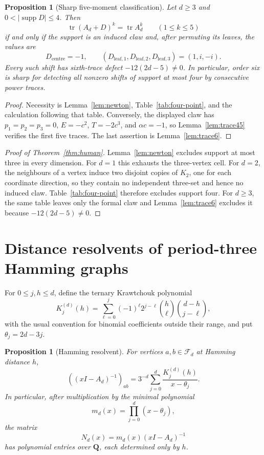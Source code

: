 \documentclass[11pt,reqno]{amsart}
\newtheorem{proposition}[theorem]{Proposition}
\theoremstyle{definition}
\theoremstyle{remark}
\DeclareMathOperator{\supp}{supp}
\DeclareMathOperator{\tr}{tr}
\newcommand{\Q}{\mathbf Q}
\begin{document}
\begin{proposition}[Sharp five-moment classification]\label{prop:five-moment}
Let $d\geq3$ and $0<|\supp D|\leq4$.  Then
\[
 \tr(A_d+D)^k=\tr A_d^k\qquad(1\leq k\leq5)
\]
if and only if the support is an induced claw and, after permuting its
leaves, the values are
\[
 D_{\mathrm{centre}}=-1,
 \qquad
 (D_{\mathrm{leaf},1},D_{\mathrm{leaf},2},D_{\mathrm{leaf},3})=(1,i,-i).
\]
Every such shift has sixth-trace defect $-12(2d-5)\neq0$.  In particular,
order six is sharp for detecting all nonzero shifts of support at most four
by consecutive power traces.
\end{proposition}

\begin{proof}
Necessity is Lemma~\ref{lem:newton}, Table~\ref{tab:four-point}, and the
calculation following that table.  Conversely, the displayed claw has
$p_1=p_2=p_3=0$, $E=-c^2$, $T=-2c^3$, and $\alpha c=-1$, so
Lemma~\ref{lem:trace45} verifies the first five traces.  The last assertion
is Lemma~\ref{lem:trace6}.
\end{proof}

\begin{proof}[Proof of Theorem~\ref{thm:human}]
Lemma~\ref{lem:newton} excludes support at most three in every dimension.
For $d=1$ this exhausts the three-vertex cell.  For $d=2$, the neighbours of
a vertex induce two disjoint copies of $K_2$, one for each coordinate
direction, so they contain no independent three-set and hence no induced
claw.  Table~\ref{tab:four-point} therefore excludes support four.  For
$d\geq3$, the same table leaves only the formal claw and
Lemma~\ref{lem:trace6} excludes it because $-12(2d-5)\neq0$.
\end{proof}

\section{Distance resolvents of period-three Hamming graphs}

For $0\leq j,h\leq d$, define the ternary Krawtchouk polynomial
\begin{equation}\label{eq:krawtchouk}
 K_j^{(d)}(h)=\sum_{\ell=0}^j(-1)^\ell2^{j-\ell}
 \binom{h}{\ell}\binom{d-h}{j-\ell},
\end{equation}
with the usual convention for binomial coefficients outside their range,
and put $\theta_j=2d-3j$.

\begin{proposition}[Hamming resolvent]\label{prop:general-resolvent}
For vertices $a,b\in\mathcal F_d$ at Hamming distance $h$,
\begin{equation}\label{eq:general-resolvent}
 ((xI-A_d)^{-1})_{ab}
 =3^{-d}\sum_{j=0}^d\frac{K_j^{(d)}(h)}{x-\theta_j}.
\end{equation}
In particular, after multiplication by the minimal polynomial
\[
 m_d(x)=\prod_{j=0}^d(x-\theta_j),
\]
the matrix
\[
 N_d(x)=m_d(x)(xI-A_d)^{-1}
\]
has polynomial entries over $\Q$, each determined only by $h$.
\end{proposition}
\end{document}
